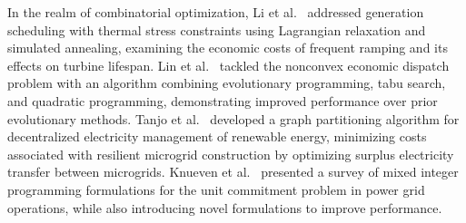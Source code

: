 \documentclass[conference]{IEEEtran}
\begin{document}

In the realm of combinatorial optimization, Li et
al.~\cite{li2003generation} addressed generation scheduling with thermal
stress constraints using Lagrangian relaxation and simulated annealing,
examining the economic costs of frequent ramping and its effects on
turbine lifespan.  Lin et al.~\cite{lin2001nonconvex} tackled the
nonconvex economic dispatch problem with an algorithm combining
evolutionary programming, tabu search, and quadratic programming,
demonstrating improved performance over prior evolutionary methods.
Tanjo et al.~\cite{tanjo2016graph} developed a graph partitioning
algorithm for decentralized electricity management of renewable energy,
minimizing costs associated with resilient microgrid construction by
optimizing surplus electricity transfer between microgrids.  Knueven et
al.~\cite{knueven2020mixed} presented a survey of mixed integer
programming formulations for the unit commitment problem in power grid
operations, while also introducing novel formulations to improve
performance.
\end{document}
